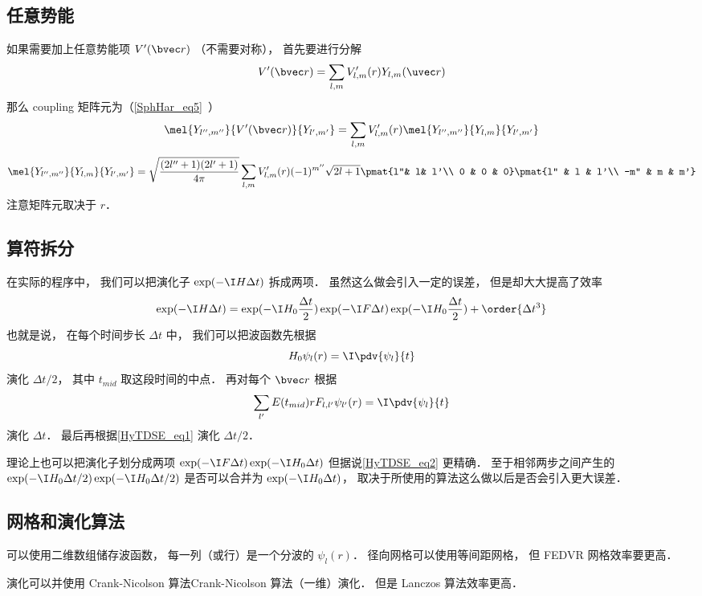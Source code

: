 \subsection{任意势能}
如果需要加上任意势能项 $V'(\bvec r)$ （不需要对称）， 首先要进行分解
\begin{equation}
V'(\bvec r) = \sum_{l,m} V'_{l,m}(r) Y_{l,m}(\uvec r)
\end{equation}
那么 coupling 矩阵元为（\autoref{SphHar_eq5}~）
\begin{equation}\label{HyTDSE_eq5}
\mel{Y_{l'',m''}}{V'(\bvec r)}{Y_{l',m'}} = \sum_{l,m} V'_{l,m}(r) \mel{Y_{l'',m''}}{Y_{l,m}}{Y_{l',m'}}
\end{equation}
\begin{equation}
\mel{Y_{l'',m''}}{Y_{l,m}}{Y_{l',m'}} = \sqrt{\frac{(2l''+1)(2l'+1)}{4\pi}}\sum_{l,m} V'_{l,m}(r) (-1)^{m''}\sqrt{2l+1} \pmat{l''& l& l'\\ 0 & 0 & 0}\pmat{l'' & l & l'\\  -m'' & m & m'}
\end{equation}
注意矩阵元取决于 $r$．

\subsection{算符拆分}
在实际的程序中， 我们可以把演化子 $\exp(-\I H \Delta t)$ 拆成两项． 虽然这么做会引入一定的误差， 但是却大大提高了效率
\begin{equation}\label{HyTDSE_eq2}
\exp(-\I H \Delta t) = \exp(-\I H_0 \frac{\Delta t}{2}) \exp(-\I F \Delta t)\exp(-\I H_0 \frac{\Delta t}{2}) + \order{\Delta t^3}
\end{equation}
也就是说， 在每个时间步长 $\Delta t$ 中， 我们可以把波函数先根据
\begin{equation}\label{HyTDSE_eq1}
H_0 \psi_{l}(r) = \I \pdv{\psi_{l}}{t}
\end{equation}
演化 $\Delta t/2$， 其中 $t_{mid}$ 取这段时间的中点． 再对每个 $\bvec r$ 根据
\begin{equation}
\sum_{l'} E(t_{mid})rF_{l, l'} \psi_{l'}(r) = \I \pdv{\psi_{l}}{t}
\end{equation}
演化 $\Delta t$． 最后再根据\autoref{HyTDSE_eq1} 演化 $\Delta t/2$．

理论上也可以把演化子划分成两项 $\exp(-\I F \Delta t)\exp(-\I H_0 {\Delta t})$ 但据说\autoref{HyTDSE_eq2} 更精确． 至于相邻两步之间产生的 $\exp(-\I H_0 {\Delta t}/{2})\exp(-\I H_0 {\Delta t}/{2})$ 是否可以合并为 $\exp(-\I H_0 {\Delta t})$， 取决于所使用的算法这么做以后是否会引入更大误差．

\subsection{网格和演化算法}

可以使用二维数组储存波函数， 每一列（或行）是一个分波的 $\psi_l(r)$． 径向网格可以使用等间距网格， 但 FEDVR 网格效率要更高．

演化可以并使用 Crank-Nicolson 算法Crank-Nicolson 算法（一维）演化． 但是 Lanczos 算法效率更高．

